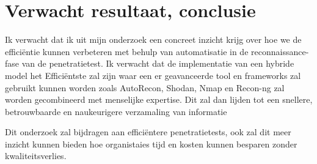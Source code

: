 


\section{Verwacht resultaat, conclusie}%
\label{sec:verwachte_resultaten}




Ik verwacht dat ik uit mijn onderzoek een concreet inzicht krijg over hoe we de efficiëntie kunnen verbeteren met behulp van 
automatisatie in de reconnaissance-fase van de penetratietest. Ik verwacht dat de implementatie van een hybride model het Efficiëntste 
zal zijn waar een er geavanceerde tool en frameworks zal gebruikt kunnen worden zoals AutoRecon, Shodan, Nmap en Recon-ng zal worden 
gecombineerd met menselijke expertise. Dit zal dan lijden tot een snellere, betrouwbaarde en naukeurigere verzamaling van informatie


Dit onderzoek zal bijdragen aan efficiëntere penetratietests, ook zal dit meer inzicht kunnen bieden hoe organistaies tijd en kosten 
kunnen besparen zonder kwaliteitsverlies.

